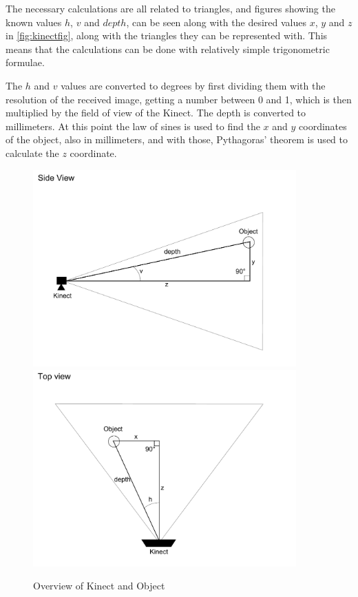 The necessary calculations are all related to triangles, and figures showing the known values $h$, $v$ and $depth$,
can be seen along with the desired values $x$, $y$ and $z$ in \autoref{fig:kinectfig},
along with the triangles they can be represented with. This means that the calculations can be done with relatively
simple trigonometric formulae.

The $h$ and $v$ values are converted to degrees by first dividing them with the resolution of the received image, getting
a number between 0 and 1, which is then multiplied by the field of view of the Kinect. The depth is converted to
millimeters. At this point the law of sines is used to find the $x$ and $y$ coordinates of the object, also in
millimeters, and with those, Pythagoras' theorem is used to calculate the $z$ coordinate.

\begin{figure}[hbtp]
\includegraphics[width=0.90\textwidth]{img/kinectfigside.pdf}
\includegraphics[width=0.90\textwidth]{img/kinectfigtop.pdf}
\caption{Overview of Kinect and Object} 
\label{fig:kinectfig} 
\end{figure}

